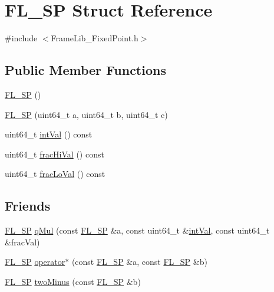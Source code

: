 \hypertarget{struct_f_l___s_p}{}\section{F\+L\+\_\+\+SP Struct Reference}
\label{struct_f_l___s_p}


{\ttfamily \#include $<$Frame\+Lib\+\_\+\+Fixed\+Point.\+h$>$}

\subsection*{Public Member Functions}
\begin{DoxyCompactItemize}
\item 
\hyperlink{struct_f_l___s_p_a862ed441d9da9edd82d368ee09686d63}{F\+L\+\_\+\+SP} ()
\item 
\hyperlink{struct_f_l___s_p_ac5e188b9e44e98f6311b6969bb1658be}{F\+L\+\_\+\+SP} (uint64\+\_\+t a, uint64\+\_\+t b, uint64\+\_\+t c)
\item 
uint64\+\_\+t \hyperlink{struct_f_l___s_p_ac515b72596b07a75ab80173537e0358a}{int\+Val} () const
\item 
uint64\+\_\+t \hyperlink{struct_f_l___s_p_a8717bf668103c1de5dfa31cdfabe1b8f}{frac\+Hi\+Val} () const
\item 
uint64\+\_\+t \hyperlink{struct_f_l___s_p_a4121e057fe776544e13014bc15aaceea}{frac\+Lo\+Val} () const
\end{DoxyCompactItemize}
\subsection*{Friends}
\begin{DoxyCompactItemize}
\item 
\hyperlink{struct_f_l___s_p}{F\+L\+\_\+\+SP} \hyperlink{struct_f_l___s_p_a78c2b8a9405fd9e810db0a43bbe03abc}{q\+Mul} (const \hyperlink{struct_f_l___s_p}{F\+L\+\_\+\+SP} \&a, const uint64\+\_\+t \&\hyperlink{struct_f_l___s_p_ac515b72596b07a75ab80173537e0358a}{int\+Val}, const uint64\+\_\+t \&frac\+Val)
\item 
\hyperlink{struct_f_l___s_p}{F\+L\+\_\+\+SP} \hyperlink{struct_f_l___s_p_a871a8c7c5ecf72cb21a348b1e86dd17b}{operator$\ast$} (const \hyperlink{struct_f_l___s_p}{F\+L\+\_\+\+SP} \&a, const \hyperlink{struct_f_l___s_p}{F\+L\+\_\+\+SP} \&b)
\item 
\hyperlink{struct_f_l___s_p}{F\+L\+\_\+\+SP} \hyperlink{struct_f_l___s_p_a2b7132318d02956c6416fef80ad2e29a}{two\+Minus} (const \hyperlink{struct_f_l___s_p}{F\+L\+\_\+\+SP} \&b)
\end{DoxyCompactItemize}


